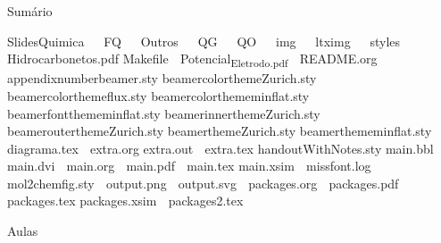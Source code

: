 \documentclass{beamer}
\date{\today}
\title{}
\begin{document}
\begin{frame}{Sumário}
\tableofcontents
\end{frame}

SlidesQuimica
 		FQ
 		Outros
 		QG
 		QO
 		img
 		ltximg
 		styles
   	Hidrocarbonetos.pdf
  Makefile
   	Potencial\textsubscript{Eletrodo.pdf}
   	README.org
  appendixnumberbeamer.sty
  beamercolorthemeZurich.sty
  beamercolorthemeflux.sty
  beamercolorthememinflat.sty
  beamerfontthememinflat.sty
  beamerinnerthemeZurich.sty
  beamerouterthemeZurich.sty
  beamerthemeZurich.sty
  beamerthememinflat.sty
   	diagrama.tex
   	extra.org
  extra.out
   	extra.tex
  handoutWithNotes.sty
  main.bbl
  main.dvi
   	main.org
   	main.pdf
   	main.tex
  main.xsim
   	missfont.log
  mol2chemfig.sty
   	output.png
   	output.svg
   	packages.org
   	packages.pdf
   	packages.tex
  packages.xsim
   	packages2.tex

Aulas
\end{document}
